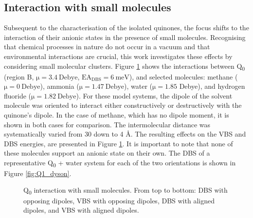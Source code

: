 \subsection{Interaction with small molecules}

Subsequent to the characterisation of the isolated quinones, the focus shifts to the interaction of their anionic states in the presence of small molecules. Recognising that chemical processes in nature do not occur in a vacuum and that environmental interactions are crucial, this work investigates these effects by considering small molecular clusters. Figure \ref{fig:scan_X} shows the interactions between Q\textsubscript{0} (region B, $\mathrm{\mu = 3.4~Debye}$, $\mathrm{EA_{DBS} = 6~meV}$), and selected molecules: methane ($\mathrm{\mu = 0~Debye}$), ammonia ($\mathrm{\mu = 1.47~Debye}$), water ($\mathrm{\mu = 1.85}$ Debye), and hydrogen fluoride ($\mathrm{\mu = 1.82~Debye}$). For these model systems, the dipole of the solvent molecule was oriented to interact either constructively or destructively with the quinone's dipole. In the case of methane, which has no dipole moment, it is shown in both cases for comparison. The intermolecular distance was systematically varied from 30 down to 4 \r{A}. The resulting effects on the VBS and DBS energies, are presented in Figure \ref{fig:scan_X}. It is important to note that none of these molecules support an anionic state on their own. The DBS of a representative Q\textsubscript{0} + water system for each of the two orientations is shown in Figure \ref{fig:Q1_dyson}.\\

\begin{figure}[th!]
    \centering
    \small
    
    \caption[Q\textsubscript{0} interaction with small molecules]{Q\textsubscript{0} interaction with small molecules. From top to bottom: DBS with opposing dipoles, VBS with opposing dipoles, DBS with aligned dipoles, and VBS with aligned dipoles.}
    \label{fig:scan_X}
\end{figure}

